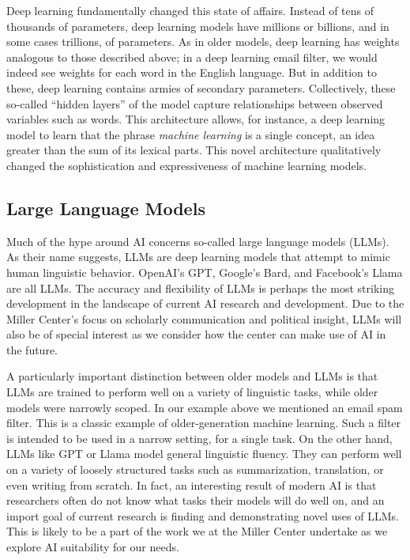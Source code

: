 \documentclass[12pt, oneside]{article}   	%
\begin{document}
Deep learning fundamentally changed this state of affairs.  Instead of tens of thousands of parameters, deep learning models have millions or billions, and in some cases trillions, of parameters.  As in older models, deep learning has weights analogous to those described above; in a deep learning email filter, we would indeed see weights for each word in the English language.  But in addition to these, deep learning contains armies of secondary parameters.  Collectively, these so-called “hidden layers” of the model capture relationships between observed variables such as words.  This architecture allows, for instance, a deep learning model to learn that the phrase \emph{machine learning} is a single concept, an idea greater than the sum of its lexical parts.  This novel architecture qualitatively changed the sophistication and expressiveness of machine learning models.


\subsection{Large Language Models}\label{section.definitions.llms}
Much of the hype around AI concerns so-called large language models (LLMs).  As their name suggests, LLMs are deep learning models that attempt to mimic human linguistic behavior.  OpenAI’s GPT, Google’s Bard, and Facebook’s Llama are all LLMs.  The accuracy and flexibility of LLMs is perhaps the most striking development in the landscape of current AI research and development.  Due to the Miller Center’s focus on scholarly communication and political insight, LLMs will also be of special interest as we consider how the center can make use of AI in the future.

A particularly important distinction between older models and LLMs is that LLMs are trained to perform well on a variety of linguistic tasks, while older models were narrowly scoped.  In our example above we mentioned an email spam filter.  This is a classic example of older-generation machine learning.  Such a filter is intended to be used in a narrow setting, for a single task.  On the other hand, LLMs like GPT or Llama model general linguistic fluency.  They can perform well on a variety of loosely structured tasks such as summarization, translation, or even writing from scratch.  In fact, an interesting result of modern AI is that researchers often do not know what tasks their models will do well on, and an import goal of current research is finding and demonstrating novel uses of LLMs.  This is likely to be a part of the work we at the Miller Center undertake as we explore AI suitability for our needs.
\end{document}
